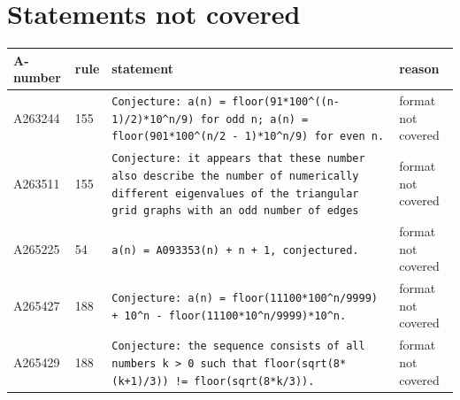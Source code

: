 \documentclass[11pt]{article}
\theoremstyle{definition}
\theoremstyle{remark}
\begin{document}
\section{Statements not covered}\label{app:other}
{\small
\begin{longtable}{p{1.3cm}p{0.7cm}p{10cm}p{3cm}}
\toprule A-number & rule & statement & reason\\\midrule\endhead
A263244 & 155 & \texttt{Conjecture: \allowbreak{}a(n)\allowbreak{} \allowbreak{}=\allowbreak{} \allowbreak{}floor(91*\allowbreak{}100\^{}((n-\allowbreak{}1)\allowbreak{}/\allowbreak{}2)\allowbreak{}*\allowbreak{}10\^{}n/\allowbreak{}9)\allowbreak{} \allowbreak{}for \allowbreak{}odd \allowbreak{}n; \allowbreak{}a(n)\allowbreak{} \allowbreak{}=\allowbreak{} \allowbreak{}floor(901*\allowbreak{}100\^{}(n/\allowbreak{}2 \allowbreak{}-\allowbreak{} \allowbreak{}1)\allowbreak{}*\allowbreak{}10\^{}n/\allowbreak{}9)\allowbreak{} \allowbreak{}for \allowbreak{}even \allowbreak{}n.} & format not covered \\
A263511 & 155 & \texttt{Conjecture: \allowbreak{}it \allowbreak{}appears \allowbreak{}that \allowbreak{}these \allowbreak{}number \allowbreak{}also \allowbreak{}describe \allowbreak{}the \allowbreak{}number \allowbreak{}of \allowbreak{}numerically \allowbreak{}different \allowbreak{}eigenvalues \allowbreak{}of \allowbreak{}the \allowbreak{}triangular \allowbreak{}grid \allowbreak{}graphs \allowbreak{}with \allowbreak{}an \allowbreak{}odd \allowbreak{}number \allowbreak{}of \allowbreak{}edges} & format not covered \\
A265225 & 54 & \texttt{a(n)\allowbreak{} \allowbreak{}=\allowbreak{} \allowbreak{}A093353(n)\allowbreak{} \allowbreak{}+\allowbreak{} \allowbreak{}n \allowbreak{}+\allowbreak{} \allowbreak{}1,\allowbreak{} \allowbreak{}conjectured.} & format not covered \\
A265427 & 188 & \texttt{Conjecture: \allowbreak{}a(n)\allowbreak{} \allowbreak{}=\allowbreak{} \allowbreak{}floor(11100*\allowbreak{}100\^{}n/\allowbreak{}9999)\allowbreak{} \allowbreak{}+\allowbreak{} \allowbreak{}10\^{}n \allowbreak{}-\allowbreak{} \allowbreak{}floor(11100*\allowbreak{}10\^{}n/\allowbreak{}9999)\allowbreak{}*\allowbreak{}10\^{}n.} & format not covered \\
A265429 & 188 & \texttt{Conjecture: \allowbreak{}the \allowbreak{}sequence \allowbreak{}consists \allowbreak{}of \allowbreak{}all \allowbreak{}numbers \allowbreak{}k \allowbreak{}> \allowbreak{}0 \allowbreak{}such \allowbreak{}that \allowbreak{}floor(sqrt(8*\allowbreak{}(k+\allowbreak{}1)\allowbreak{}/\allowbreak{}3)\allowbreak{})\allowbreak{} \allowbreak{}!=\allowbreak{} \allowbreak{}floor(sqrt(8*\allowbreak{}k/\allowbreak{}3)\allowbreak{})\allowbreak{}.} & format not covered \\

\end{longtable}}
\end{document}
